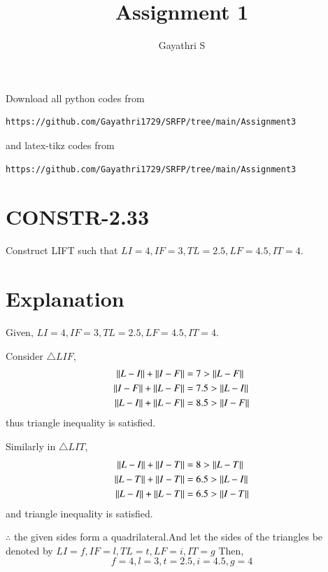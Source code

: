 \documentclass[journal,12pt,twocolumn]{IEEEtran}
\begin{document}
     \def\rightbox#1{\makebox[0in][r]{#1}}
     \def\centbox#1{\makebox[0in]{#1}}
     \def\topbox#1{\raisebox{-\baselineskip}[0in][0in]{#1}}
     \def\midbox#1{\raisebox{-0.5\baselineskip}[0in][0in]{#1}}
%
\title{Assignment 1} 
\author{Gayathri S}
\maketitle
\newpage
\bigskip
\renewcommand{\thefigure}{\theenumi}
\renewcommand{\thetable}{\theenumi}
Download all python codes from 
\begin{lstlisting}
https://github.com/Gayathri1729/SRFP/tree/main/Assignment3
\end{lstlisting}
%
and latex-tikz codes from 
%
\begin{lstlisting}
https://github.com/Gayathri1729/SRFP/tree/main/Assignment3
\end{lstlisting}
%
\section{CONSTR-2.33}
Construct LIFT such that $LI =4,IF =3,TL =2.5,LF =4.5,IT =4$.
\section{Explanation}
Given, $LI =4,IF =3,TL =2.5,LF =4.5,IT =4$.

Consider $\triangle LIF$,
\begin{align}
    \left\lVert L-I\right\rVert+\left\lVert I-F\right\rVert &=7 >\left\lVert L-F\right\rVert\\
    \left\lVert I-F\right\rVert+\left\lVert L-F\right\rVert &=7.5 >\left\lVert L-I\right\rVert\\
    \left\lVert L-I\right\rVert+\left\lVert L-F\right\rVert &=8.5 >\left\lVert I-F\right\rVert
\end{align}
thus triangle inequality is satisfied.

Similarly in $\triangle LIT$,
\begin{align}
    \left\lVert L-I\right\rVert+\left\lVert I-T\right\rVert &=8 >\left\lVert L-T\right\rVert\\
    \left\lVert L-T\right\rVert+\left\lVert I-T\right\rVert &=6.5 >\left\lVert L-I\right\rVert\\
    \left\lVert L-I\right\rVert+\left\lVert L-T\right\rVert &=6.5 >\left\lVert I-T\right\rVert
\end{align}
and triangle inequality is satisfied.

$\therefore$ the given sides form a quadrilateral.And let the sides of the triangles be denoted by $LI=f,IF=l,TL=t,LF=i,IT=g$ 
Then,
\begin{equation}
   f=4,l=3,t=2.5,i=4.5,g=4 
\end{equation}
\end{document}
